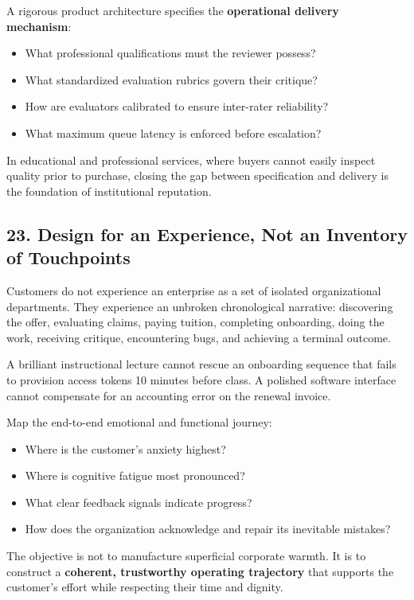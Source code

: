 A rigorous product architecture specifies the \textbf{operational delivery mechanism}:
\begin{itemize}
    \item What professional qualifications must the reviewer possess?
    \item What standardized evaluation rubrics govern their critique?
    \item How are evaluators calibrated to ensure inter-rater reliability?
    \item What maximum queue latency is enforced before escalation?
\end{itemize}

In educational and professional services, where buyers cannot easily inspect quality prior to purchase, closing the gap between specification and delivery is the foundation of institutional reputation.

\subsection*{23. Design for an Experience, Not an Inventory of Touchpoints}

Customers do not experience an enterprise as a set of isolated organizational departments. They experience an unbroken chronological narrative: discovering the offer, evaluating claims, paying tuition, completing onboarding, doing the work, receiving critique, encountering bugs, and achieving a terminal outcome.

A brilliant instructional lecture cannot rescue an onboarding sequence that fails to provision access tokens 10 minutes before class. A polished software interface cannot compensate for an accounting error on the renewal invoice.

Map the end-to-end emotional and functional journey:
\begin{itemize}
    \item Where is the customer's anxiety highest?
    \item Where is cognitive fatigue most pronounced?
    \item What clear feedback signals indicate progress?
    \item How does the organization acknowledge and repair its inevitable mistakes?
\end{itemize}

The objective is not to manufacture superficial corporate warmth. It is to construct a \textbf{coherent, trustworthy operating trajectory} that supports the customer's effort while respecting their time and dignity.
